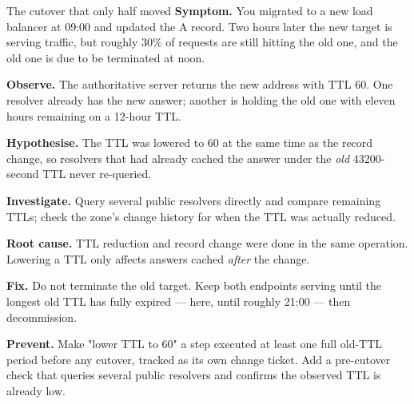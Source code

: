 \begin{debuglab}{The cutover that only half moved}
\textbf{Symptom.} You migrated  to a new load balancer at 09:00 and updated the A record. Two hours later the new target is serving traffic, but roughly 30\% of requests are still hitting the old one, and the old one is due to be terminated at noon.


\begin{tickcheck}
  \item \textbf{Observe.} The authoritative server returns the new address with TTL 60. One resolver already has the new answer; another is holding the old one with eleven hours remaining on a 12-hour TTL.
  \item \textbf{Hypothesise.} The TTL was lowered to 60 at the same time as the record change, so resolvers that had already cached the answer under the \emph{old} 43200-second TTL never re-queried.
  \item \textbf{Investigate.} Query several public resolvers directly and compare remaining TTLs; check the zone's change history for when the TTL was actually reduced.
  \item \textbf{Root cause.} TTL reduction and record change were done in the same operation. Lowering a TTL only affects answers cached \emph{after} the change.
  \item \textbf{Fix.} Do not terminate the old target. Keep both endpoints serving until the longest old TTL has fully expired --- here, until roughly 21:00 --- then decommission.
  \item \textbf{Prevent.} Make "lower TTL to 60" a step executed at least one full old-TTL period before any cutover, tracked as its own change ticket. Add a pre-cutover check that queries several public resolvers and confirms the observed TTL is already low.
\end{tickcheck}
\end{debuglab}

